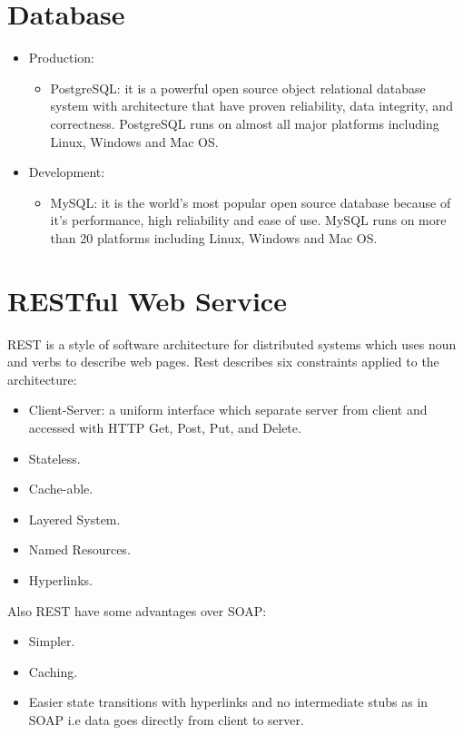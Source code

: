 \section{Database}
\begin{itemize}
 \item Production:
  \begin{itemize}
   \item PostgreSQL: it is a powerful open source object relational database system 
      with architecture that have proven reliability, data integrity, and correctness. 
      PostgreSQL runs on almost all major platforms including Linux, Windows and Mac OS.
  \end{itemize}
 \item Development:
 \begin{itemize}
  \item MySQL: it is the world’s most popular open source database because of it’s performance,
      high reliability and ease of use. MySQL runs on more than 20 platforms including Linux, Windows and Mac OS.
 \end{itemize}
\end{itemize}

\section{RESTful Web Service}
REST is a style of software architecture for distributed systems which uses noun and verbs to describe 
web pages. Rest describes six constraints applied to the architecture:
\begin{itemize}
 \item Client-Server: a uniform interface which separate server from client and accessed with HTTP Get, Post, Put, and Delete.
 \item Stateless.
 \item Cache-able.
 \item Layered System.
 \item Named Resources.
 \item Hyperlinks.
\end{itemize}

Also REST have some advantages over SOAP:
\begin{itemize}
 \item Simpler.
 \item Caching.
 \item Easier state transitions with hyperlinks and no intermediate stubs as in SOAP i.e data goes directly from client to server.
\end{itemize}

